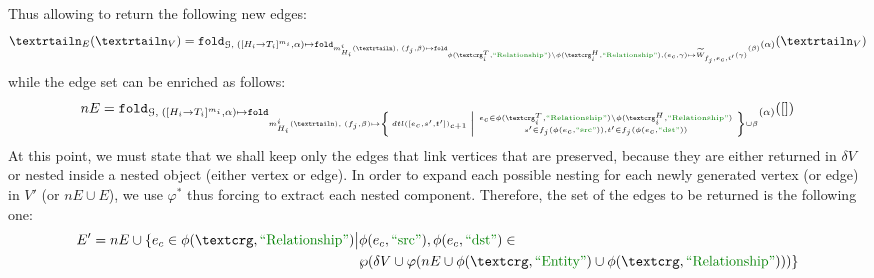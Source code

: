 Thus allowing to return the following new edges:
\[\nested_E(\nested_V)=\texttt{fold}_{\mathcal{G},\;([H_i\to T_i]^{m_i},\alpha)\mapsto \texttt{fold}_{m^i_{H_i}(\nested),\;(f_j,\beta)\mapsto \texttt{fold}_{\phi(\ngraph_i^T,\RELA)\backslash\phi(\ngraph_i^H,\RELA),(e_c,\gamma)\mapsto \widetilde{W}_{f_j,e_c,i'}(\gamma)}(\beta) }(\alpha)}(\nested_V)\]
while the edge set can be enriched as follows:
\begin{equation}\label{eq:newgenE}
nE=\texttt{fold}_{\mathcal{G},\;([H_i\to T_i]^{m_i},\alpha)\mapsto \texttt{fold}_{m^i_{H_i}(\nested),\;(f_j,\beta)\mapsto \Set{dtl([e_c,s',t'])_{c+1}|\genfrac{}{}{0pt}{}{e_c\in \phi(\ngraph_i^T,\RELA)\backslash\phi(\ngraph_i^H,\RELA)}{s'\in f_j(\phi(e_c,\SRC)),t'\in f_j(\phi(e_c,\DST))}}\cup\beta }(\alpha)}([])
\end{equation}
At this point, we must state that we shall keep only the edges that link vertices that are preserved, because they are either returned in $\delta V$ or nested inside a nested object (either vertex or edge). In order to expand each possible nesting for each newly generated vertex (or edge) in $V'$ (or $nE\cup E$), we use $\varphi^*$  thus forcing to extract each nested component. Therefore, the set of the edges to be returned is the following one:
\begin{equation}\label{eq:eFinal}
\begin{split}
E' = nE \cup \{e_c\in \phi(\ngraph,\RELA)\big |&\phi(e_c,\SRC),\phi(e_c,\DST)\in\\
	&\partof{\delta V\cup\varphi(nE\cup \phi(\ngraph,\ONTA)\cup \phi(\ngraph,\RELA))}\}\\
\end{split}
\end{equation}



